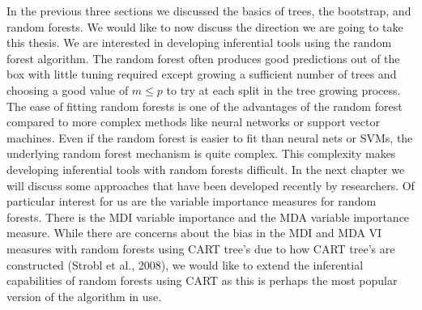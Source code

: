 \documentclass[12pt,twoside]{reedthesis}
\theoremstyle{definition}
\theoremstyle{definition}
\theoremstyle{definition}
\theoremstyle{remark}
\begin{document}
In the previous three sections we discussed the basics of trees, the
bootstrap, and random forests. We would like to now discuss the
direction we are going to take this thesis. We are interested in
developing inferential tools using the random forest algorithm. The
random forest often produces good predictions out of the box with little
tuning required except growing a sufficient number of trees and choosing
a good value of \(m\leq p\) to try at each split in the tree growing
process. The ease of fitting random forests is one of the advantages of
the random forest compared to more complex methods like neural networks
or support vector machines. Even if the random forest is easier to fit
than neural nets or SVMs, the underlying random forest mechanism is
quite complex. This complexity makes developing inferential tools with
random forests difficult. In the next chapter we will discuss some
approaches that have been developed recently by researchers. Of
particular interest for us are the variable importance measures for
random forests. There is the MDI variable importance and the MDA
variable importance measure. While there are concerns about the bias in
the MDI and MDA VI measures with random forests using CART tree's due to
how CART tree's are constructed (Strobl et al., 2008), we would like to
extend the inferential capabilities of random forests using CART as this
is perhaps the most popular version of the algorithm in use. \par
\end{document}
